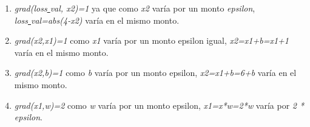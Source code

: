 \documentclass{book}
\begin{document}
			\begin{enumerate}
				\item \textit{grad(loss\underline{ }val, x2)=1} ya que como \textit{x2} var\'ia por un monto \textit{epsilon}, \\		\textit{loss\underline{ }val=abs(4-x2)} var\'ia en el mismo monto.
				\item \textit{grad(x2,x1)=1} como \textit{x1} var\'ia por un monto epsilon igual, \textit{x2=x1+b=x1+1} var\'ia en el mismo monto.
				\item \textit{grad(x2,b)=1} como \textit{b} var\'ia por un monto epsilon, \textit{x2=x1+b=6+b} var\'ia en el mismo monto.
				\item \textit{grad(x1,w)=2} como \textit{w} var\'ia por un monto epsilon, \textit{x1=x*w=2*w} var\'ia por \textit{2 * epsilon}.
			\end{enumerate}
\end{document}
